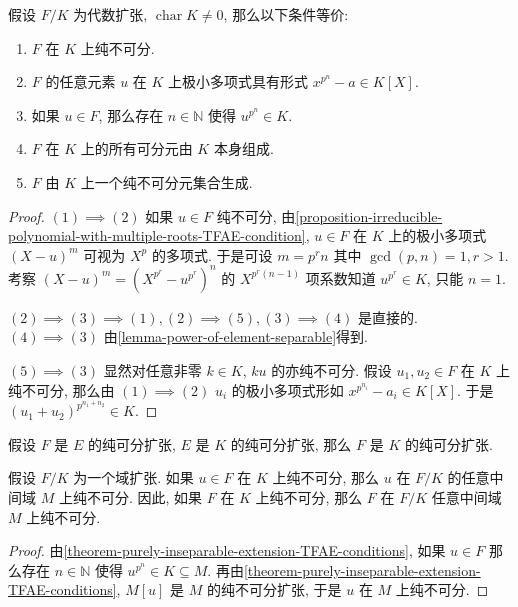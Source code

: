 \begin{theorem}
  \label{theorem-purely-inseparable-extension-TFAE-conditions}
  假设 \( F/K \) 为代数扩张, \( \operatorname{char} K \neq 0 \),
  那么以下条件等价:
  \begin{enumerate}
    \item \( F \) 在 \( K \) 上纯不可分.
    \item \( F \) 的任意元素 \( u \) 在 \( K \) 上极小多项式具有形式 \( x^{p^n}
      - a \in K[X] \).
    \item 如果 \( u \in F \), 那么存在 \( n \in \mathbb{N} \) 使得 \( u^{p^n}
      \in K \).
    \item \( F \) 在 \( K \) 上的所有可分元由 \( K \) 本身组成.
    \item \( F \) 由 \( K \) 上一个纯不可分元集合生成.
  \end{enumerate}
\end{theorem}
\begin{proof}
  \( (1) \implies (2) \)
  如果 \( u \in F \) 纯不可分,
  由\cref{proposition-irreducible-polynomial-with-multiple-roots-TFAE-condition},
  \( u \in F \) 在 \( K \) 上的极小多项式 \( (X - u)^m \) 可视为 \( X^p \)
  的多项式.
  于是可设 \( m = p^rn \) 其中 \( \gcd(p, n) = 1, r > 1 \).
  考察 \( (X - u)^{m} = (X^{p^r} - u^{p^r})^n \) 的 \( X^{p^r(n - 1)} \)
  项系数知道 \( u^{p^r} \in K \), 只能 \( n = 1 \).

  \( (2) \implies (3) \implies (1), (2) \implies (5), (3) \implies (4) \)
  是直接的.
  \( (4) \implies (3) \) 由\cref{lemma-power-of-element-separable}得到.

  \( (5) \implies (3) \)
  显然对任意非零 \( k \in K \), \( ku \) 的亦纯不可分.
  假设 \( u_1, u_2 \in F \) 在 \( K \) 上纯不可分, 那么由 \( (1) \implies (2) \)
  \( u_i \) 的极小多项式形如 \( x^{p^{n_i}} - a_i \in K[X] \).
  于是 \( (u_1 + u_2)^{p^{n_1 + n_2}} \in K \).
\end{proof}

\begin{corollary}
  假设 \( F \) 是 \( E \) 的纯可分扩张, \( E \) 是 \( K \) 的纯可分扩张, 那么 \(
  F \) 是 \( K \) 的纯可分扩张.
\end{corollary}

\begin{corollary}
  \label{corollary-purely-inseparable-over-middle-extension}
  假设 \( F/K \) 为一个域扩张.
  如果 \( u \in F \) 在 \( K \) 上纯不可分, 那么 \( u \) 在 \( F/K \)
  的任意中间域 \( M \) 上纯不可分.
  因此, 如果 \( F \) 在 \( K \) 上纯不可分, 那么 \( F \) 在 \( F/K \) 任意中间域
  \( M \) 上纯不可分.
\end{corollary}
\begin{proof}
  由\cref{theorem-purely-inseparable-extension-TFAE-conditions},
  如果 \( u \in F \) 那么存在 \( n \in \mathbb{N} \) 使得 \( u^{p^n} \in K
  \subseteq M \).
  再由\cref{theorem-purely-inseparable-extension-TFAE-conditions}, \( M[u] \) 是
  \( M \) 的纯不可分扩张, 于是 \( u \) 在 \( M \) 上纯不可分.
\end{proof}

